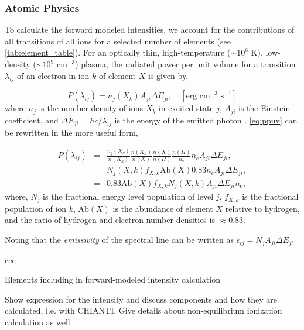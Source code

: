 \documentclass[preprint,linenumbers]{aastex62}
\begin{document}
\subsubsection{Atomic Physics}
\label{atomic}
To calculate the forward modeled intensities, we account for the contributions of all transitions of all ions for a selected number of elements (see \autoref{tab:element_table}). For an optically thin, high-temperature ($\sim10^6$ K), low-density ($\sim10^9$ cm$^{-3}$) plasma, the radiated power per unit volume for a transition $\lambda_{ij}$ of an electron in ion $k$ of element $X$ is given by,

\begin{equation}
    \label{eq:ppuv}
    P(\lambda_{ij}) = n_j(X_k)A_{ji}\Delta E_{ji},\quad[\text{erg cm}^{-3}\text{ s}^{-1}]
\end{equation}
where $n_j$ is the number density of ions $X_k$ in excited state $j$, $A_{ji}$ is the Einstein coefficient, and $\Delta E_{ji}=hc/\lambda_{ij}$ is the energy of the emitted photon  \citep[see][]{mason_spectroscopic_1994,bradshaw_collisional_2013}. \autoref{eq:ppuv} can be rewritten in the more useful form,

\begin{eqnarray*}
    P(\lambda_{ij}) &=& \frac{n_j(X_k)}{n(X_k)}\frac{n(X_k)}{n(X)}\frac{n(X)}{n(H)}\frac{n(H)}{n_e}n_eA_{ji}\Delta E_{ji}, \\
    &=& N_j(X,k) f_{X,k} \mathrm{Ab}(X) 0.83 n_e A_{ji} \Delta E_{ji}, \\
    &=& 0.83 \mathrm{Ab}(X) f_{X,k} N_j(X,k) A_{ji} \Delta E_{ji} n_e,
\end{eqnarray*}
where, $N_j$ is the fractional energy level population of level $j$, $f_{X,k}$ is the fractional population of ion $k$, $\mathrm{Ab}(X)$ is the abundance of element $X$ relative to hydrogen, and the ratio of hydrogen and electron number densities is $\approx0.83$. 

Noting that the \textit{emissivity} of the spectral line can be written as $\epsilon_{ij}=N_j A_{ji} \Delta E_{ji}$
\begin{deluxetable}{ccc}
    \caption{Elements including in forward-modeled intensity calculation\label{tab:element_table}}
    \startdata
    \enddata
\end{deluxetable}

Show expression for the intensity and discuss components and how they are calculated, i.e. with CHIANTI. Give details about non-equilibrium ionization calculation as well.
\end{document}
